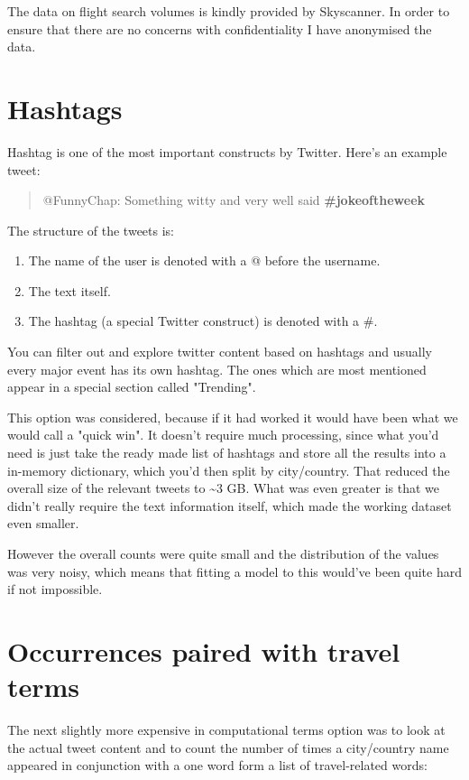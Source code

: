 \documentclass[minf,frontabs,twoside,singlespacing,parskip]{infthesis} %
\begin{document}
The data on flight search volumes is kindly provided by Skyscanner. In order to ensure that there are no concerns with confidentiality I have anonymised the data. 

\section{Hashtags}

Hashtag is one of the most important constructs by Twitter. Here's an example tweet:

\begin{quotation}
@FunnyChap: Something witty and very well said \bf{\#jokeoftheweek}
\end{quotation}

The structure of the tweets is:
\begin{enumerate}
\item The name of the user is denoted with a @ before the username.
\item The text itself.
\item The hashtag (a special Twitter construct) is denoted with a \#.
\end{enumerate}

You can filter out and explore twitter content based on hashtags and usually every major event has its own hashtag. The ones which are most mentioned appear in a special section called "Trending".

This option was considered, because if it had worked it would have been what we would call a "quick win". It doesn't require much processing, since what you'd need is just take the ready made list of hashtags and store all the results into a in-memory dictionary, which you'd then split by city/country. That reduced the overall size of the relevant tweets to \textasciitilde 3 GB. What was even greater is that we didn't really require the text information itself, which made the working dataset even smaller. 

However the overall counts were quite small and the distribution of the values was very noisy, which means that fitting a model to this would've been quite hard if not impossible.

\section{Occurrences paired with travel terms} 

The next slightly more expensive in computational terms option was to look at the actual tweet content and to count the number of times a city/country name appeared in conjunction with a one word form a list of travel-related words:
\end{document}

